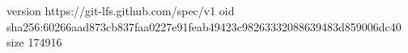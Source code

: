 version https://git-lfs.github.com/spec/v1
oid sha256:60266aad873cb837faa0227e91feab49423c98263332088639483d859006dc40
size 174916
